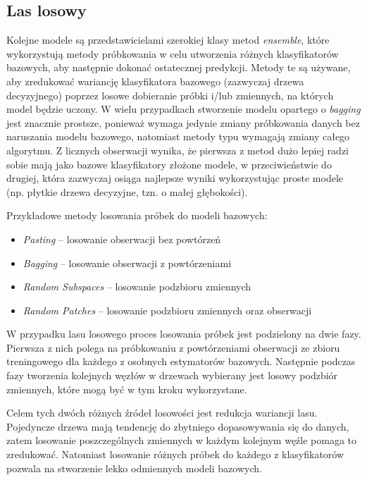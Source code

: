 \documentclass[inzynierska]{pwr_wmat_praca_dyplomowa}
\theoremstyle{plain}
\numberwithin{theorem}{chapter}
\theoremstyle{definition}
\numberwithin{theorem}{chapter}
\begin{document}
\subsection{Las losowy}
Kolejne modele są przedstawicielami szerokiej klasy metod \textit{ensemble}, które wykorzystują metody próbkowania w celu utworzenia różnych klasyfikatorów bazowych, aby następnie dokonać ostatecznej predykcji. Metody te są używane, aby zredukować wariancję klasyfikatora bazowego (zazwyczaj drzewa decyzyjnego) poprzez losowe dobieranie próbki i/lub zmiennych, na których model będzie uczony. W wielu przypadkach stworzenie modelu opartego o \textit{bagging} jest znacznie prostsze, ponieważ wymaga jedynie zmiany próbkowania danych bez naruszania modelu bazowego, natomiast metody typu  wymagają zmiany całego algorytmu. Z licznych obserwacji wynika, że pierwsza z metod dużo lepiej radzi sobie mają jako bazowe klasyfikatory złożone modele, w przeciwieństwie do drugiej, która zazwyczaj osiąga najlepsze wyniki wykorzystując proste modele (np. płytkie drzewa decyzyjne, tzn. o małej głębokości).

Przykładowe metody losowania próbek do modeli bazowych:
\begin{itemize}
	\item \textit{Pasting} -- losowanie obserwacji bez powtórzeń
	\item \textit{Bagging} -- losowanie obserwacji z powtórzeniami
	\item \textit{Random Subspaces} -- losowanie podzbioru zmiennych
	\item \textit{Random Patches} -- losowanie podzbioru zmiennych oraz obserwacji 
\end{itemize}

W przypadku lasu losowego proces losowania próbek jest podzielony na dwie fazy. Pierwsza z nich polega na próbkowaniu z powtórzeniami obserwacji ze zbioru treningowego dla każdego z osobnych estymatorów bazowych. Następnie podczas fazy tworzenia kolejnych węzłów w drzewach wybierany jest losowy podzbiór zmiennych, które mogą być w tym kroku wykorzystane. 

Celem tych dwóch różnych źródeł losowości jest redukcja wariancji lasu. Pojedyncze drzewa mają tendencję do zbytniego dopasowywania się do danych, zatem losowanie poszczególnych zmiennych w każdym kolejnym węźle pomaga to zredukować. Natomiast losowanie różnych próbek do każdego z klasyfikatorów pozwala na stworzenie lekko odmiennych modeli bazowych.
\end{document}
